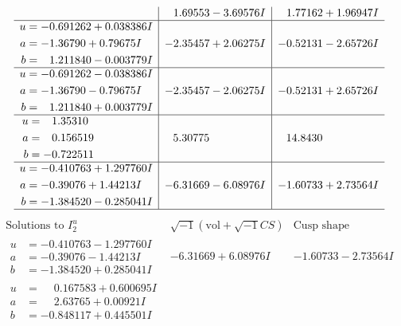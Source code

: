 \documentclass[1p]{elsarticle_modified}
\theoremstyle{definition}
\newcommand{\I}{\sqrt{-1}}
\begin{document}
$$\begin{array}{c|c|c}
 & \phantom{-}1.69553 - 3.69576 I & \phantom{-}1.77162 + 1.96947 I \\ \hline\begin{aligned}
u &= -0.691262 + 0.038386 I \\
a &= -1.36790 + 0.79675 I \\
b &= \phantom{-}1.211840 - 0.003779 I\end{aligned}
 & -2.35457 + 2.06275 I & -0.52131 - 2.65726 I \\ \hline\begin{aligned}
u &= -0.691262 - 0.038386 I \\
a &= -1.36790 - 0.79675 I \\
b &= \phantom{-}1.211840 + 0.003779 I\end{aligned}
 & -2.35457 - 2.06275 I & -0.52131 + 2.65726 I \\ \hline\begin{aligned}
u &= \phantom{-}1.35310\phantom{ +0.000000I} \\
a &= \phantom{-}0.156519\phantom{ +0.000000I} \\
b &= -0.722511\phantom{ +0.000000I}\end{aligned}
 & \phantom{-}5.30775\phantom{ +0.000000I} & \phantom{-}14.8430\phantom{ +0.000000I} \\ \hline\begin{aligned}
u &= -0.410763 + 1.297760 I \\
a &= -0.39076 + 1.44213 I \\
b &= -1.384520 - 0.285041 I\end{aligned}
 & -6.31669 - 6.08976 I & -1.60733 + 2.73564 I\\
 \hline 
 \end{array}$$\newpage$$\begin{array}{c|c|c}  
\text{Solutions to }I^u_{2}& \I (\text{vol} + \sqrt{-1}CS) & \text{Cusp shape}\\
 \hline 
\begin{aligned}
u &= -0.410763 - 1.297760 I \\
a &= -0.39076 - 1.44213 I \\
b &= -1.384520 + 0.285041 I\end{aligned}
 & -6.31669 + 6.08976 I & -1.60733 - 2.73564 I \\ \hline\begin{aligned}
u &= \phantom{-}0.167583 + 0.600695 I \\
a &= \phantom{-}2.63765 + 0.00921 I \\
b &= -0.848117 + 0.445501 I\end{aligned}

\end{array}$$
\end{document}
